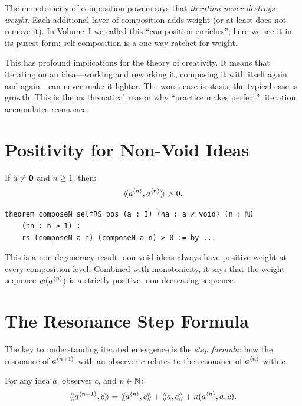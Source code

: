 \begin{interpretation}
The monotonicity of composition powers says that \emph{iteration never destroys
weight}. Each additional layer of composition adds weight (or at least does not
remove it). In Volume~I we called this ``composition enriches''; here we see it
in its purest form: self-composition is a one-way ratchet for weight.

This has profound implications for the theory of creativity. It means that
iterating on an idea---working and reworking it, composing it with itself
again and again---can never make it lighter. The worst case is stasis; the
typical case is growth. This is the mathematical reason why ``practice makes
perfect'': iteration accumulates resonance.
\end{interpretation}


\section{Positivity for Non-Void Ideas}

\begin{theorem}
\label{thm:composeN-pos}
If $a \neq \mathbf{0}$ and $n \geq 1$, then:
\[
  \langle\!\langle a^{\langle n \rangle}, a^{\langle n \rangle} \rangle\!\rangle > 0.
\]
\end{theorem}

\begin{lstlisting}[caption={Positivity (IDT\_v3\_Emergence.lean)}]
theorem composeN_selfRS_pos (a : I) (ha : a ≠ void) (n : ℕ)
    (hn : n ≥ 1) :
    rs (composeN a n) (composeN a n) > 0 := by ...
\end{lstlisting}

This is a non-degeneracy result: non-void ideas always have positive weight at
every composition level. Combined with monotonicity, it says that the weight
sequence $w(a^{\langle n \rangle})$ is a strictly positive, non-decreasing sequence.


\section{The Resonance Step Formula}

The key to understanding iterated emergence is the \emph{step formula}: how the
resonance of $a^{\langle n+1 \rangle}$ with an observer $c$ relates to the resonance of
$a^{\langle n \rangle}$ with $c$.

\begin{theorem}
\label{thm:resonance-step}
For any idea $a$, observer $c$, and $n \in \mathbb{N}$:
\[
  \langle\!\langle a^{\langle n+1 \rangle}, c \rangle\!\rangle = \langle\!\langle a^{\langle n \rangle}, c \rangle\!\rangle + \langle\!\langle a, c \rangle\!\rangle + \kappa(a^{\langle n \rangle}, a, c).
\]
\end{theorem}

